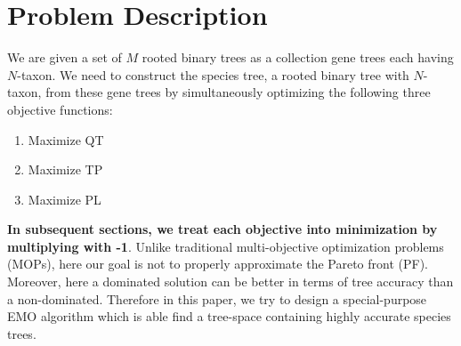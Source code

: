 \section{Problem Description}
\label{sec:problem}
We are given a set of $M$ rooted binary trees as a collection gene trees each having $N$-taxon. We need to construct the species tree, a rooted binary tree with $N$-taxon, from these gene trees by simultaneously optimizing the following three objective functions:  
\begin{enumerate}[label=$F\arabic*$.]
		
	\item Maximize QT 
	\item Maximize TP
	\item Maximize PL 
\end{enumerate}
\textbf{In subsequent sections, we treat each objective into minimization by multiplying with -1}. Unlike traditional multi-objective optimization
problems (MOPs), here our goal is not to properly approximate the Pareto front (PF). 
Moreover, here a dominated solution can be better in terms of tree accuracy than a non-dominated. Therefore in this paper, we try to design a special-purpose EMO algorithm which is able find a tree-space containing highly accurate species trees. 
